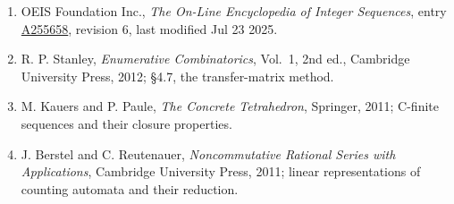 \documentclass[11pt]{article}
\theoremstyle{definition}
\begin{document}
\begin{enumerate}

\item OEIS Foundation Inc., \emph{The On-Line Encyclopedia of Integer Sequences}, entry \href{https://oeis.org/A255658}{A255658}, revision 6, last modified Jul 23 2025.

\item R. P. Stanley, \emph{Enumerative Combinatorics}, Vol.~1, 2nd ed., Cambridge University Press, 2012; \S4.7, the transfer-matrix method.

\item M. Kauers and P. Paule, \emph{The Concrete Tetrahedron}, Springer, 2011; C-finite sequences and their closure properties.

\item J. Berstel and C. Reutenauer, \emph{Noncommutative Rational Series with Applications}, Cambridge University Press, 2011; linear representations of counting automata and their reduction.

\end{enumerate}
\end{document}
